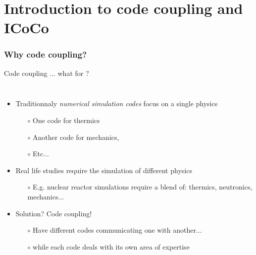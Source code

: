 \documentclass[10pt, hyperref={unicode=true,pdfusetitle, bookmarks=true,bookmarksnumbered=false,bookmarksopen=false, breaklinks=false,pdfborder={0 0 1},backref=true,colorlinks=true,linkcolor=darkblue,pageanchor, urlcolor=darkblue}]{beamer}
\begin{document}
\section{{\bf{Introduction to code coupling and ICoCo}}}
\begin{frame}
\frametitle{Why code coupling?}
\begin{block}{Code coupling ... what for ?}

\begin{columns}[c] 
\begin{itemize}
\item Traditionnaly \textit{numerical simulation codes} focus on a single physics
    \begin{itemize}
    \item [$\circ$] One code for thermics
    \item [$\circ$] Another code for mechanics,
    \item [$\circ$] Etc...
    \end{itemize}
\item Real life studies require the simulation of different physics
    \begin{itemize}
    \item [$\circ$] E.g. nuclear reactor simulations require a blend of: thermics, neutronics, mechanics...
    \end{itemize}
\item Solution? Code coupling!
    \begin{itemize}
    \item [$\circ$] Have different codes communicating one with another...
    \item [$\circ$] while each code deals with its own area of expertise
    \end{itemize}
\end{itemize}


\end{columns}
\end{block}
\end{frame}
\end{document}
